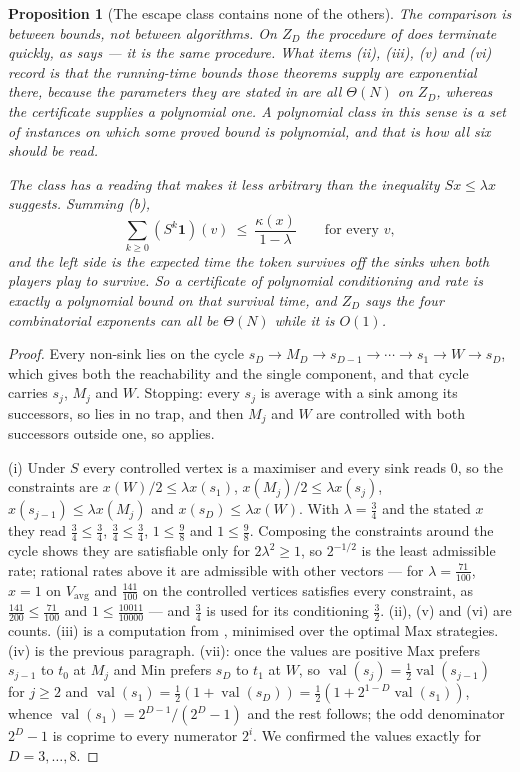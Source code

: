 \documentclass[11pt]{article}
\theoremstyle{plain}
\newtheorem{proposition}[theorem]{Proposition}
\theoremstyle{definition}
\DeclareMathOperator{\val}{val}
\newcommand{\Vavg}{V_{\mathrm{avg}}}
\newcommand{\bbone}{\mathbf{1}}
\begin{document}
\begin{proposition}[The escape class contains none of the
others]
The comparison is between \emph{bounds}, not between algorithms. On
$Z_D$ the procedure of  does terminate quickly, as
 says --- it is the same procedure. What items
(ii), (iii), (v) and (vi) record is that the running-time bounds those
theorems supply are exponential there, because the parameters they are
stated in are all $\Theta(N)$ on $Z_D$, whereas the certificate supplies
a polynomial one. A polynomial class in this sense is a set of instances
on which some proved bound is polynomial, and that is how all six should
be read.

The class has a reading that makes it less arbitrary than the inequality
$Sx\le\lambda x$ suggests. Summing (b),
\[
  \sum_{k\ge0}(S^{k}\bbone)(v)\ \le\ \frac{\kappa(x)}{1-\lambda}
  \qquad\text{for every }v,
\]
and the left side is the expected time the token survives off the sinks
when \emph{both} players play to survive. So a certificate of polynomial
conditioning and rate is exactly a polynomial bound on that survival time,
and $Z_D$ says the four combinatorial exponents can all be $\Theta(N)$
while it is $O(1)$.
\end{proposition}

\begin{proof}
Every non-sink lies on the cycle
$s_D\to M_D\to s_{D-1}\to\cdots\to s_1\to W\to s_D$, which gives both the
reachability and the single component, and that cycle carries $s_j$,
$M_j$ and $W$. Stopping: every $s_j$ is average with a sink among its
successors, so lies in no trap, and then $M_j$ and $W$ are controlled
with both successors outside one, so  applies.

(i) Under $S$ every controlled vertex is a maximiser and every sink reads
$0$, so the constraints are $x(W)/2\le\lambda x(s_1)$,
$x(M_j)/2\le\lambda x(s_j)$, $x(s_{j-1})\le\lambda x(M_j)$ and
$x(s_D)\le\lambda x(W)$. With $\lambda=\tfrac34$ and the stated $x$ they
read $\tfrac34\le\tfrac34$, $\tfrac34\le\tfrac34$, $1\le\tfrac98$ and
$1\le\tfrac98$. Composing the constraints around the cycle shows they are satisfiable
only for $2\lambda^{2}\ge1$, so $2^{-1/2}$ is the least admissible rate;
rational rates above it are admissible with other vectors --- for
$\lambda=\tfrac{71}{100}$, $x=1$ on $\Vavg$ and $\tfrac{141}{100}$ on the
controlled vertices satisfies every constraint, as
$\tfrac{141}{200}\le\tfrac{71}{100}$ and $1\le\tfrac{10011}{10000}$ ---
and $\tfrac34$ is used for its conditioning $\tfrac32$. (ii), (v) and (vi) are counts.
(iii) is a computation from , minimised over the
optimal Max strategies. (iv) is the previous paragraph. (vii): once the
values are positive Max prefers $s_{j-1}$ to $t_0$ at $M_j$ and Min prefers
$s_D$ to $t_1$ at $W$, so $\val(s_j)=\tfrac12\val(s_{j-1})$ for $j\ge2$ and
$\val(s_1)=\tfrac12(1+\val(s_D))=\tfrac12(1+2^{1-D}\val(s_1))$, whence
$\val(s_1)=2^{D-1}/(2^{D}-1)$ and the rest follows; the odd denominator
$2^{D}-1$ is coprime to every numerator $2^{i}$. We confirmed the values
exactly for $D=3,\dots,8$.
\end{proof}
\end{document}
